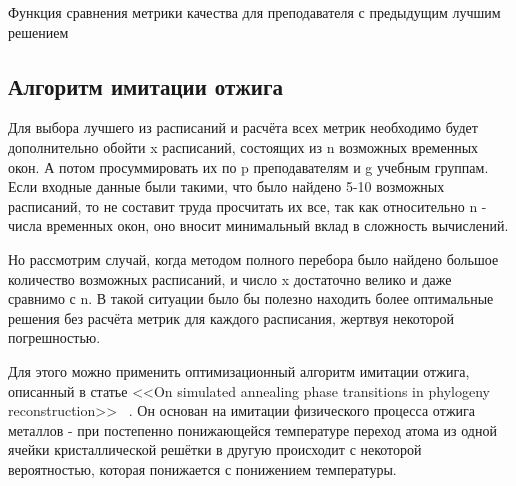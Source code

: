 \begin{algorithm} 
	\nonl{}
	\caption{Функция сравнения метрики качества для преподавателя с предыдущим лучшим решением}	
	\label{alg:algoW}
\end{algorithm} 
\FloatBarrier

\subsection{Алгоритм имитации отжига}
Для выбора лучшего из расписаний и расчёта всех метрик необходимо будет дополнительно обойти x расписаний, состоящих из n возможных временных окон. А потом просуммировать их по p преподавателям и g учебным группам. 
Если входные данные были такими, что было найдено 5-10 возможных расписаний, то не составит труда просчитать их все, так как относительно n - числа временных окон, оно вносит минимальный вклад в сложность вычислений.

Но рассмотрим случай, когда методом полного перебора было найдено большое количество возможных расписаний, и число x достаточно велико и даже сравнимо с n. В такой ситуации было бы полезно находить более оптимальные решения без расчёта метрик для каждого расписания, жертвуя некоторой погрешностью.

Для этого можно применить оптимизационный алгоритм имитации отжига, описанный в статье <<On simulated annealing phase transitions in phylogeny reconstruction>> ~\cite{sim}. Он основан на имитации физического процесса отжига металлов - при постепенно понижающейся температуре переход атома из одной ячейки кристаллической решётки в другую происходит с некоторой вероятностью, которая понижается с понижением температуры.

